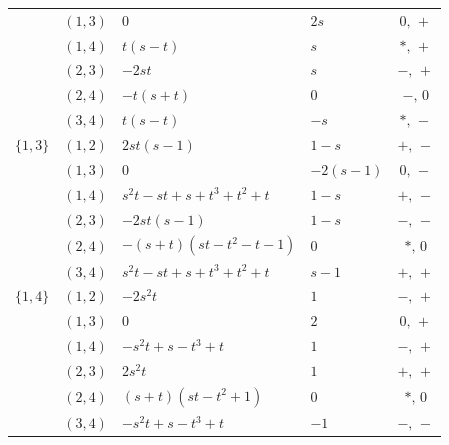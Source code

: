 \documentclass[11pt]{article}
\theoremstyle{remark}
\begin{document}
{\begin{longtable}{@{}l c l l c@{}}
 & $(1,3)$ & $0$ & $2 s$ & $0,\,+$ \\
 & $(1,4)$ & $t \left(s - t\right)$ & $s$ & $\ast,\,+$ \\
 & $(2,3)$ & $- 2 s t$ & $s$ & $-,\,+$ \\
 & $(2,4)$ & $- t \left(s + t\right)$ & $0$ & $-,\,0$ \\
 & $(3,4)$ & $t \left(s - t\right)$ & $- s$ & $\ast,\,-$ \\
\midrule
$\{1,3\}$ & $(1,2)$ & $2 s t \left(s - 1\right)$ & $1 - s$ & $+,\,-$ \\
 & $(1,3)$ & $0$ & $- 2 \left(s - 1\right)$ & $0,\,-$ \\
 & $(1,4)$ & $s^{2} t - s t + s + t^{3} + t^{2} + t$ & $1 - s$ & $+,\,-$ \\
 & $(2,3)$ & $- 2 s t \left(s - 1\right)$ & $1 - s$ & $-,\,-$ \\
 & $(2,4)$ & $- \left(s + t\right) \left(s t - t^{2} - t - 1\right)$ & $0$ & $\ast,\,0$ \\
 & $(3,4)$ & $s^{2} t - s t + s + t^{3} + t^{2} + t$ & $s - 1$ & $+,\,+$ \\
\midrule
$\{1,4\}$ & $(1,2)$ & $- 2 s^{2} t$ & $1$ & $-,\,+$ \\
 & $(1,3)$ & $0$ & $2$ & $0,\,+$ \\
 & $(1,4)$ & $- s^{2} t + s - t^{3} + t$ & $1$ & $-,\,+$ \\
 & $(2,3)$ & $2 s^{2} t$ & $1$ & $+,\,+$ \\
 & $(2,4)$ & $\left(s + t\right) \left(s t - t^{2} + 1\right)$ & $0$ & $\ast,\,0$ \\
 & $(3,4)$ & $- s^{2} t + s - t^{3} + t$ & $-1$ & $-,\,-$ \\
\bottomrule
\end{longtable}
}
\end{document}
